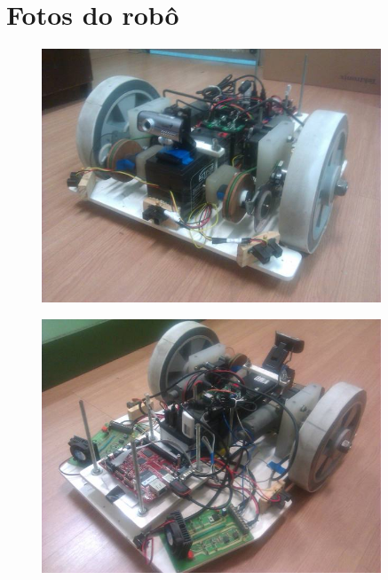 \documentclass[oneside,a4paper,12pt]{normas-utf-tex}
\begin{document}
\chapter{Fotos do robô}

\begin{figure}[H]
	\centering
	\includegraphics[width=0.9\textwidth]{./figuras/robo/fotos/foto1.jpg}
	\label{fig:robo_foto1}
\end{figure}

\begin{figure}[H]
	\centering
	\includegraphics[width=0.9\textwidth]{./figuras/robo/fotos/foto2.jpg}
	\label{fig:robo_foto2}
\end{figure}
\end{document}
